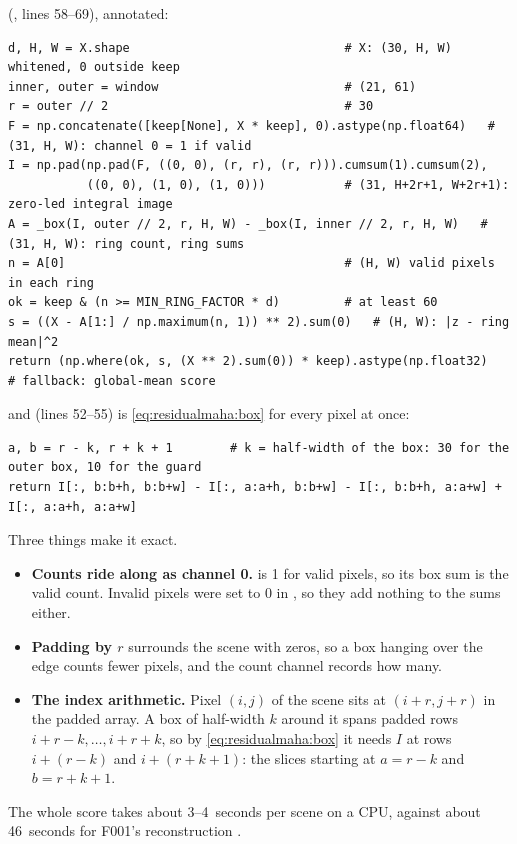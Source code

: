  (, lines 58--69), annotated:
\begin{lstlisting}
d, H, W = X.shape                              # X: (30, H, W) whitened, 0 outside keep
inner, outer = window                          # (21, 61)
r = outer // 2                                 # 30
F = np.concatenate([keep[None], X * keep], 0).astype(np.float64)   # (31, H, W): channel 0 = 1 if valid
I = np.pad(np.pad(F, ((0, 0), (r, r), (r, r))).cumsum(1).cumsum(2),
           ((0, 0), (1, 0), (1, 0)))           # (31, H+2r+1, W+2r+1): zero-led integral image
A = _box(I, outer // 2, r, H, W) - _box(I, inner // 2, r, H, W)   # (31, H, W): ring count, ring sums
n = A[0]                                       # (H, W) valid pixels in each ring
ok = keep & (n >= MIN_RING_FACTOR * d)         # at least 60
s = ((X - A[1:] / np.maximum(n, 1)) ** 2).sum(0)   # (H, W): |z - ring mean|^2
return (np.where(ok, s, (X ** 2).sum(0)) * keep).astype(np.float32)   # fallback: global-mean score
\end{lstlisting}
and  (lines 52--55) is \cref{eq:residualmaha:box} for every pixel at once:
\begin{lstlisting}
a, b = r - k, r + k + 1        # k = half-width of the box: 30 for the outer box, 10 for the guard
return I[:, b:b+h, b:b+w] - I[:, a:a+h, b:b+w] - I[:, b:b+h, a:a+w] + I[:, a:a+h, a:a+w]
\end{lstlisting}
Three things make it exact.
\begin{itemize}
\item \textbf{Counts ride along as channel 0.}  is 1 for valid pixels, so its box sum is the valid
  count. Invalid pixels were set to 0 in , so they add nothing to the sums either.
\item \textbf{Padding by $r$} surrounds the scene with zeros, so a box hanging over the edge counts fewer
  pixels, and the count channel records how many.
\item \textbf{The index arithmetic.} Pixel $(i,j)$ of the scene sits at $(i+r,j+r)$ in the padded array. A box
  of half-width $k$ around it spans padded rows $i+r-k,\dots,i+r+k$, so by \cref{eq:residualmaha:box} it needs
  $I$ at rows $i+(r-k)$ and $i+(r+k+1)$: the slices starting at $a=r-k$ and $b=r+k+1$.
\end{itemize}
The whole score takes about 3--4~seconds per scene on a CPU, against about 46~seconds for F001's
reconstruction .

